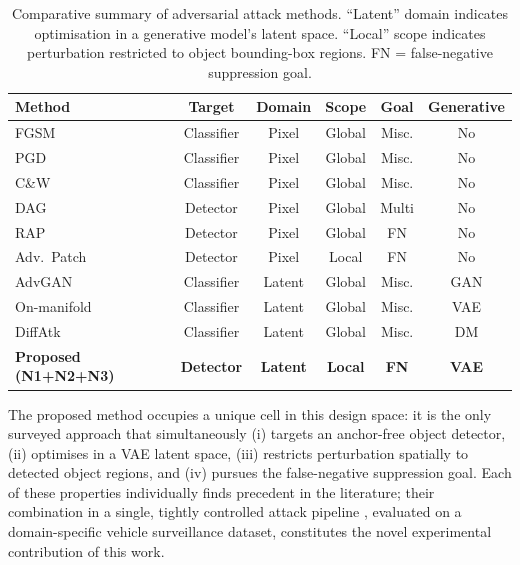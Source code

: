 \documentclass[12pt,a4paper]{report}
\begin{document}
\begin{table}[htbp]
  \centering
  \caption{Comparative summary of adversarial attack methods.
           ``Latent'' domain indicates optimisation in a generative model's
           latent space. ``Local'' scope indicates perturbation restricted to
           object bounding-box regions. FN = false-negative suppression goal.}
  \label{tab:related_work}
  \small
  \begin{tabular}{@{}lccccc@{}}
    \toprule
    \textbf{Method} & \textbf{Target} & \textbf{Domain} &
    \textbf{Scope} & \textbf{Goal} & \textbf{Generative} \\
    \midrule
    FGSM \cite{goodfellow2014explaining}         & Classifier & Pixel   & Global & Misc.      & No  \\
    PGD \cite{madry2018towards}               & Classifier & Pixel   & Global & Misc.      & No  \\
    C\&W \cite{carlini2017evaluating}            & Classifier & Pixel   & Global & Misc.      & No  \\
    DAG \cite{xie2017adversarial}              & Detector   & Pixel   & Global & Multi      & No  \\
    RAP \cite{li2020robust}               & Detector   & Pixel   & Global & FN         & No  \\
    Adv.\ Patch \cite{brown2017patch}  & Detector   & Pixel   & Local  & FN         & No  \\
    AdvGAN \cite{xiao2018generating}   & Classifier & Latent  & Global & Misc.      & GAN \\
    On-manifold \cite{stutz2019disentangling} & Classifier & Latent & Global & Misc. & VAE \\
    DiffAtk \cite{xue2023diffusion}      & Classifier & Latent  & Global & Misc.      & DM  \\
    \midrule
    \textbf{Proposed (N1+N2+N3)}       & \textbf{Detector} & \textbf{Latent} &
    \textbf{Local} & \textbf{FN} & \textbf{VAE} \\
    \bottomrule
  \end{tabular}
\end{table}

The proposed method occupies a unique cell in this design space: it is the
only surveyed approach that simultaneously (i) targets an anchor-free object
detector, (ii) optimises in a VAE latent space, (iii) restricts perturbation
spatially to detected object regions, and (iv) pursues the false-negative
suppression goal. Each of these properties individually finds precedent in the
literature; their combination in a single, tightly controlled attack pipeline
, evaluated on a domain-specific vehicle surveillance dataset, constitutes
the novel experimental contribution of this work.
\end{document}
